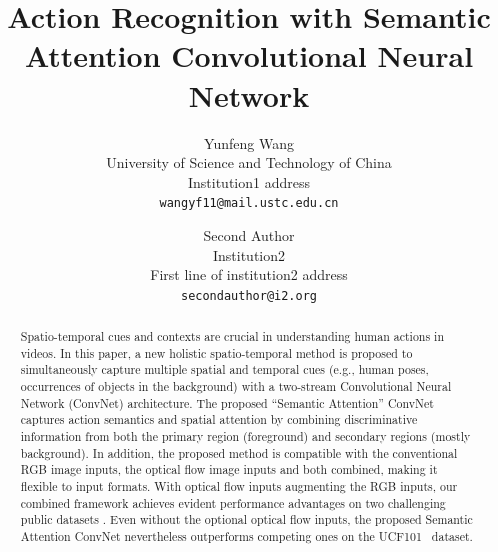 \documentclass[10pt,twocolumn,letterpaper]{article}
\begin{document}
\title{Action Recognition with Semantic Attention Convolutional Neural Network}
%
\author{Yunfeng Wang\\
University of Science and Technology of China\\
Institution1 address\\
{\tt\small wangyf11@mail.ustc.edu.cn}
\and
Second Author\\
Institution2\\
First line of institution2 address\\
{\tt\small secondauthor@i2.org}
}

\maketitle


\begin{abstract}
Spatio-temporal cues and contexts are crucial in understanding human actions in videos. In this paper, a new holistic spatio-temporal method is proposed to simultaneously capture multiple spatial and temporal cues (e.g., human poses, occurrences of objects in the background) with a two-stream Convolutional Neural Network (ConvNet) architecture. The proposed ``Semantic Attention'' ConvNet captures action semantics and spatial attention by combining discriminative information from both the primary region (foreground) and secondary regions (mostly background). In addition, the proposed method is compatible with the conventional RGB image inputs, the optical flow image inputs and both combined, making it flexible to input formats. With optical flow inputs augmenting the RGB inputs, our combined framework achieves evident performance advantages on two challenging public datasets \cite{soomro2012ucf101,Kuehne11}. Even without the optional optical flow inputs, the proposed Semantic Attention ConvNet nevertheless outperforms competing ones on the UCF101~\cite{soomro2012ucf101} dataset. 
%
\end{abstract}



\end{document}
